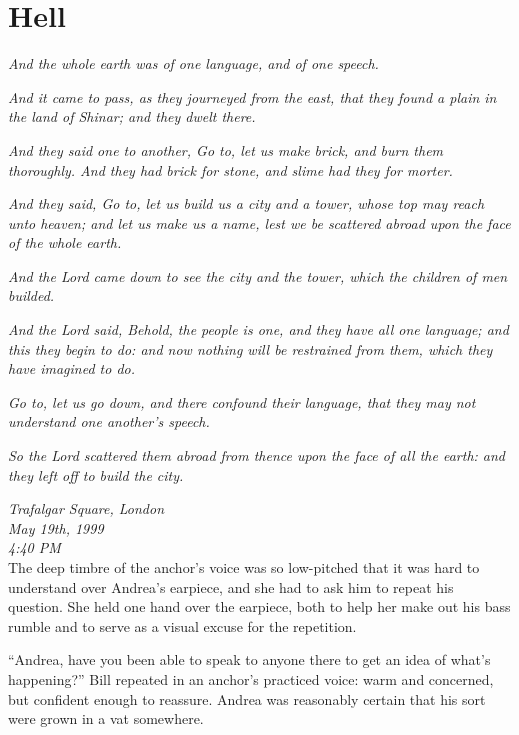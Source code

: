 \hypertarget{hell}{%
\chapter{Hell}\label{hell}}

\emph{And the whole earth was of one language, and of one speech.}

\emph{And it came to pass, as they journeyed from the east, that they
found a plain in the land of Shinar; and they dwelt there.}

\emph{And they said one to another, Go to, let us make brick, and burn
them thoroughly. And they had brick for stone, and slime had they for
morter.}

\emph{And they said, Go to, let us build us a city and a tower, whose
top may reach unto heaven; and let us make us a name, lest we be
scattered abroad upon the face of the whole earth.}

\emph{And the Lord came down to see the city and the tower, which the
children of men builded.}

\emph{And the Lord said, Behold, the people is one, and they have all
one language; and this they begin to do: and now nothing will be
restrained from them, which they have imagined to do.}

\emph{Go to, let us go down, and there confound their language, that
they may not understand one another's speech.}

\emph{So the Lord scattered them abroad from thence upon the face of all
the earth: and they left off to build the city.}


\mybreak

\emph{Trafalgar Square, London}\\
\emph{May 19th, 1999}\\
\emph{4:40 PM}\\

The deep timbre of the anchor's voice was so low-pitched that it was
hard to understand over Andrea's earpiece, and she had to ask him to
repeat his question. She held one hand over the earpiece, both to help
her make out his bass rumble and to serve as a visual excuse for the
repetition.

``Andrea, have you been able to speak to anyone there to get an idea of
what's happening?'' Bill repeated in an anchor's practiced voice: warm
and concerned, but confident enough to reassure. Andrea was reasonably
certain that his sort were grown in a vat somewhere.

